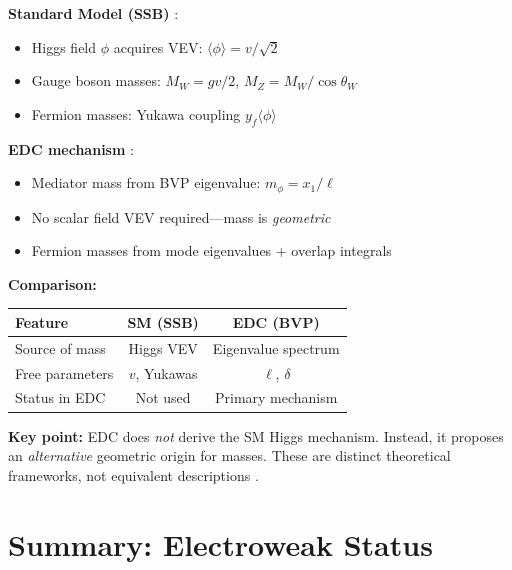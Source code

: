 \begin{tcolorbox}[colback=blue!5!white, colframe=blue!50!black,
    title=\textbf{Dictionary: Mass Generation Mechanisms}]
\textbf{Standard Model (SSB)} \tagBL{}:
\begin{itemize}[nosep]
\item Higgs field $\phi$ acquires VEV: $\langle\phi\rangle = v/\sqrt{2}$
\item Gauge boson masses: $M_W = gv/2$, $M_Z = M_W/\cos\theta_W$
\item Fermion masses: Yukawa coupling $y_f \langle\phi\rangle$
\end{itemize}

\textbf{EDC mechanism} \tagDc{}:
\begin{itemize}[nosep]
\item Mediator mass from BVP eigenvalue: $m_\phi = x_1/\ell$
\item No scalar field VEV required---mass is \emph{geometric}
\item Fermion masses from mode eigenvalues + overlap integrals
\end{itemize}

\textbf{Comparison:}
\begin{center}
\begin{tabular}{lcc}
\toprule
\textbf{Feature} & \textbf{SM (SSB)} & \textbf{EDC (BVP)} \\
\midrule
Source of mass & Higgs VEV & Eigenvalue spectrum \\
Free parameters & $v$, Yukawas & $\ell$, $\delta$ \\
Status in EDC & Not used & Primary mechanism \\
\bottomrule
\end{tabular}
\end{center}

\textbf{Key point:} EDC does \emph{not} derive the SM Higgs mechanism. Instead, it
proposes an \emph{alternative} geometric origin for masses. These are distinct
theoretical frameworks, not equivalent descriptions \tagDc{}.
\end{tcolorbox}

\section{Summary: Electroweak Status}
\label{sec:ew_summary}

